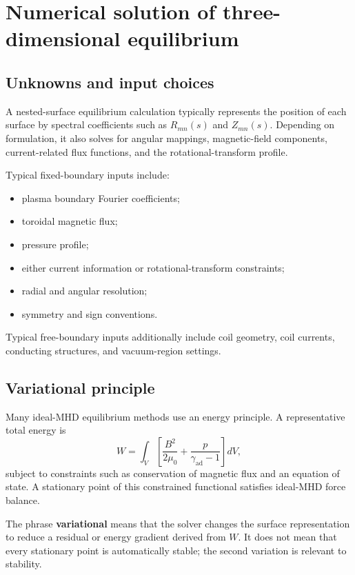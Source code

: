 \section{Numerical solution of three-dimensional equilibrium}
\label{sec:equilibrium_solvers}

\subsection{Unknowns and input choices}
A nested-surface equilibrium calculation typically represents the position of each surface by spectral coefficients such as $R_{mn}(s)$ and $Z_{mn}(s)$. Depending on formulation, it also solves for angular mappings, magnetic-field components, current-related flux functions, and the rotational-transform profile.

Typical fixed-boundary inputs include:
\begin{itemize}[leftmargin=1.6em]
\item plasma boundary Fourier coefficients;
\item toroidal magnetic flux;
\item pressure profile;
\item either current information or rotational-transform constraints;
\item radial and angular resolution;
\item symmetry and sign conventions.
\end{itemize}
Typical free-boundary inputs additionally include coil geometry, coil currents, conducting structures, and vacuum-region settings.

\subsection{Variational principle}
Many ideal-MHD equilibrium methods use an energy principle. A representative total energy is
\begin{equation}
W=\int_V\left[
\frac{B^2}{2\mu_0}
+\frac{p}{\gamma_{\mathrm{ad}}-1}
\right]dV,
\label{eq:equilibrium_energy}
\end{equation}
subject to constraints such as conservation of magnetic flux and an equation of state. A stationary point of this constrained functional satisfies ideal-MHD force balance.

The phrase \textbf{variational} means that the solver changes the surface representation to reduce a residual or energy gradient derived from $W$. It does not mean that every stationary point is automatically stable; the second variation is relevant to stability.

